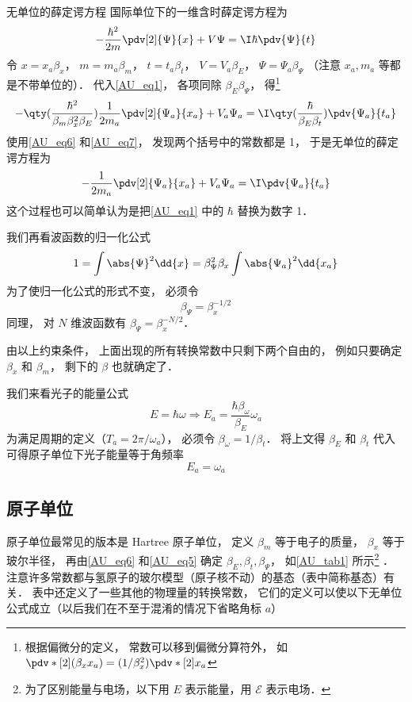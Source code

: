 \begin{example}{无单位的薛定谔方程}
国际单位下的一维含时薛定谔方程为
\begin{equation}\label{AU_eq1}
-\frac{\hbar^2}{2m} \pdv[2]{\Psi}{x} + V\Psi= \I\hbar \pdv{\Psi}{t}
\end{equation}
令 $x = x_a\beta_x$， $m = m_a\beta_m$， $t = t_a\beta_t$， $V = V_a\beta_E$， $\Psi = \Psi_a \beta_\Psi$ （注意 $x_a, m_a$ 等都是不带单位的）．
代入\autoref{AU_eq1}， 各项同除 $\beta_E\beta_\Psi$， 得\footnote{根据偏微分的定义， 常数可以移到偏微分算符外， 如 $\pdv*[2]{(\beta_x x_a)} = (1/\beta_x^2) \pdv*[2]{x_a}$}
\begin{equation}\label{AU_eq3}
-\qty(\frac{\hbar^2}{\beta_m\beta_x^2\beta_E})\frac{1}{2m_a} \pdv[2]{\Psi_a}{x_a} + V_a\Psi_a= \I\qty(\frac{\hbar}{\beta_E\beta_t})\pdv{\Psi_a}{t_a}
\end{equation}
使用\autoref{AU_eq6} 和\autoref{AU_eq7}， 发现两个括号中的常数都是 1， 于是无单位的薛定谔方程为
\begin{equation}\label{AU_eq4}
-\frac{1}{2m_a} \pdv[2]{\Psi_a}{x_a} + V_a\Psi_a= \I\pdv{\Psi_a}{t_a}
\end{equation}
这个过程也可以简单认为是把\autoref{AU_eq1} 中的 $\hbar$ 替换为数字 1．

我们再看波函数的归一化公式
\begin{equation}
1 = \int \abs{\Psi}^2 \dd{x} = \beta_\Psi^2 \beta_x \int \abs{\Psi_a}^2 \dd{x_a}
\end{equation}
为了使归一化公式的形式不变， 必须令
\begin{equation}\label{AU_eq5}
\beta_\Psi = \beta_x^{-1/2}
\end{equation}
同理， 对 $N$ 维波函数有 $\beta_\Psi = \beta_x^{-N/2}$．
\end{example}

由以上约束条件， 上面出现的所有转换常数中只剩下两个自由的， 例如只要确定 $\beta_x$ 和 $\beta_m$， 剩下的 $\beta$ 也就确定了．

我们来看光子的能量公式
\begin{equation}
E = \hbar \omega \Longrightarrow E_a = \frac{\hbar\beta_\omega}{\beta_E}\omega_a
\end{equation}
为满足周期的定义（$T_a = 2\pi/\omega_a$）， 必须令 $\beta_\omega = 1/\beta_t$． 将上文得 $\beta_E$ 和 $\beta_t$ 代入可得原子单位下光子能量等于角频率
\begin{equation}\label{AU_eq2}
E_a = \omega_a
\end{equation}

\subsection{原子单位}
原子单位最常见的版本是 Hartree 原子单位， 定义 $\beta_m$ 等于电子的质量， $\beta_x$ 等于玻尔半径， 再由\autoref{AU_eq6} 和\autoref{AU_eq5} 确定 $\beta_E, \beta_t, \beta_\Psi$， 如\autoref{AU_tab1} 所示\footnote{为了区别能量与电场，以下用 $E$ 表示能量，用 $\mathcal{E}$ 表示电场．} ． 注意许多常数都与氢原子的玻尔模型（原子核不动）的基态（表中简称基态）有关． 表中还定义了一些其他的物理量的转换常数， 它们的定义可以使以下无单位公式成立（以后我们在不至于混淆的情况下省略角标 $a$）

